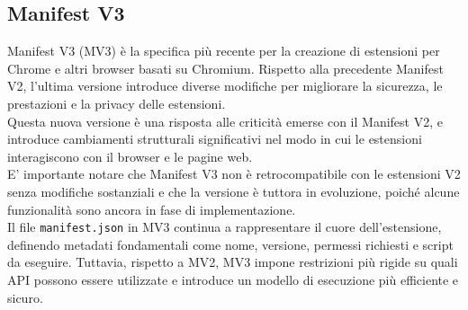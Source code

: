 \subsection{Manifest V3}
\noindent Manifest V3 (MV3) è la specifica più recente per la creazione di estensioni per Chrome e altri browser basati su Chromium. Rispetto alla precedente Manifest V2, l'ultima versione introduce diverse modifiche per migliorare la sicurezza, le prestazioni e la privacy delle estensioni.  \\
Questa nuova versione è una risposta alle criticità emerse con il Manifest V2, e introduce cambiamenti strutturali significativi nel modo in cui le estensioni interagiscono con il browser e le pagine web.\\
E' importante notare che Manifest V3 non è retrocompatibile con le estensioni V2 senza modifiche sostanziali e che la versione è tuttora in evoluzione, poiché alcune funzionalità sono ancora in fase di implementazione.\\
Il file \texttt{manifest.json} in MV3 continua a rappresentare il cuore dell’estensione, definendo metadati fondamentali come nome, versione, permessi richiesti e script da eseguire. Tuttavia, rispetto a MV2, MV3 impone restrizioni più rigide su quali API possono essere utilizzate e introduce un modello di esecuzione più efficiente e sicuro.\\

